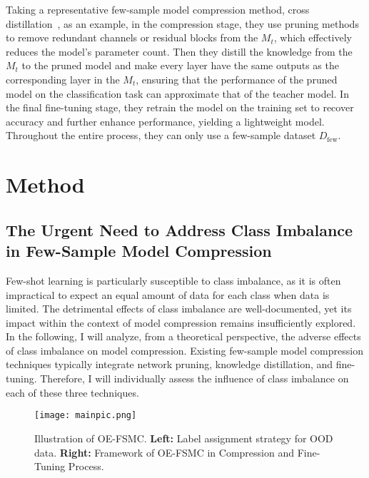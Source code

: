 \documentclass[twoside,11pt]{article}
\begin{document}
Taking a representative few-sample model compression method,  cross distillation~\citep{bai2020few}, as an example, in the compression stage, they use pruning methods to remove redundant channels or residual blocks from the $ M_t $, which effectively reduces the model's parameter count. Then they distill the knowledge from the $ M_t $ to the pruned model and make every layer have the same outputs as the corresponding layer in the $ M_t $, ensuring that the performance of the pruned model on the classification task can approximate that of the teacher model. In the final fine-tuning stage, they retrain the model on the training set to recover accuracy and further enhance performance, yielding a lightweight model. Throughout the entire process, they can only use a few-sample dataset $ D_{\text{few}}$.



\section{Method}


 \subsection{The Urgent Need to Address Class Imbalance in Few-Sample Model Compression}
Few-shot learning is particularly susceptible to class imbalance, as it is often impractical to expect an equal amount of data for each class when data is limited. The detrimental effects of class imbalance are well-documented, yet its impact within the context of model compression remains insufficiently explored. In the following, I will analyze, from a theoretical perspective, the adverse effects of class imbalance on model compression. Existing few-sample model compression techniques typically integrate network pruning, knowledge distillation, and fine-tuning. Therefore, I will individually assess the influence of class imbalance on each of these three techniques.


\begin{figure*}[ht]
\centering
\texttt{[image: mainpic.png]}
\caption{Illustration of OE-FSMC. \textbf{Left:} Label assignment strategy for OOD data. \textbf{Right:} Framework of OE-FSMC in Compression and Fine-Tuning Process.} 
\label{fig:mainpic}
\end{figure*}
 
\end{document}
